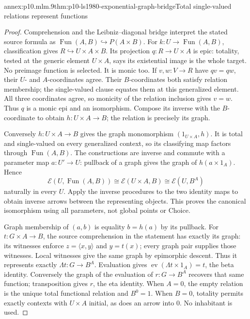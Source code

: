 \begin{annexitem}{annex:p10.mlm.9}{thm:p10-ls1980-exponential-graph-bridge}{Total single-valued relations represent functions}
\begin{proof}
Comprehension and the Leibniz--diagonal bridge interpret the stated source
formula as \(\operatorname{Fun}(A,B)\hookrightarrow P(A\times B)\).
For \(k:U\to\operatorname{Fun}(A,B)\), classification gives
\(R\hookrightarrow U\times A\times B\). Its projection \(q:R\to U\times A\)
is epic: totality, tested at the generic element \(U\times A\), says its
existential image is the whole target. No preimage function is selected.
It is monic too. If \(v,w:V\to R\) have \(qv=qw\), their \(U\)- and
\(A\)-coordinates agree. Their \(B\)-coordinates both satisfy relation
membership; the single-valued clause equates them at this generalized
element. All three coordinates agree, so monicity of the relation inclusion
gives \(v=w\). Thus \(q\) is a monic epi and an isomorphism. Compose its
inverse with the \(B\)-coordinate to obtain \(h:U\times A\to B\); the
relation is precisely its graph.

Conversely \(h:U\times A\to B\) gives the graph monomorphism
\((1_{U\times A},h)\). It is total and single-valued on every generalized
context, so its classifying map factors through \(\operatorname{Fun}(A,B)\).
The constructions are inverse and commute with a parameter map \(a:U'\to U\):
pullback of a graph gives the graph of \(h(a\times1_A)\). Hence
\[
 \mathcal E(U,\operatorname{Fun}(A,B))\cong
 \mathcal E(U\times A,B)\cong\mathcal E(U,B^A)
\]
naturally in every \(U\). Apply the inverse procedures to the two identity
maps to obtain inverse arrows between the representing objects. This proves
the canonical isomorphism using all parameters, not global points or Choice.

Graph membership of \((a,b)\) is equality \(b=h(a)\) by its pullback.
For \(t:G\times A\to B\), the source comprehension in the statement has
exactly its graph: its witnesses enforce \(z=\langle x,y\rangle\) and
\(y=t(x)\); every graph pair supplies those witnesses. Local witnesses give
the same graph by epimorphic descent. Thus it represents exactly
\(\Lambda t:G\to B^A\). Evaluation gives
\(\operatorname{ev}(\Lambda t\times1_A)=t\), the beta identity.
Conversely the graph of the evaluation of \(r:G\to B^A\) recovers that same
function; transposition gives \(r\), the eta identity.
When \(A=0\), the empty relation is the unique total functional relation
and \(B^0=1\). When \(B=0\), totality permits exactly contexts with
\(U\times A\) initial, as does an arrow into \(0\). No inhabitant is used.


\end{proof}
\end{annexitem}
